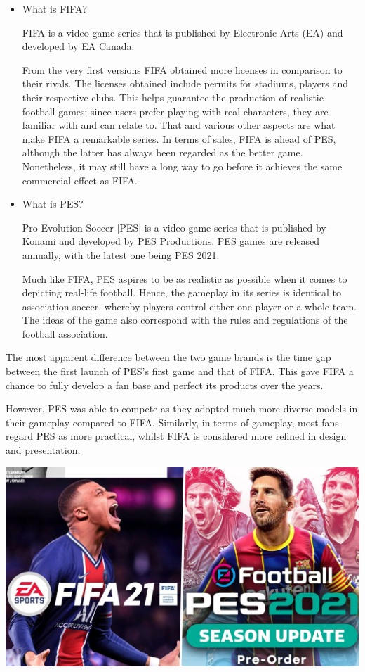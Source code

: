\documentclass[12pt,twoside,english,a4paper]{article}
\begin{document}
\begin{itemize}
\item What is FIFA?

FIFA is a video game series that is published by Electronic Arts (EA) and developed by EA Canada.

From the very first versions FIFA obtained more licenses in comparison to their rivals. The licenses obtained include permits for stadiums, players and their respective clubs. This helps guarantee the production of realistic football games; since users prefer playing with real characters, they are familiar with and can relate to. That and various other aspects are what make FIFA a remarkable series. In terms of sales, FIFA is ahead of PES, although the latter has always been regarded as the better game. Nonetheless, it may still have a long way to go before it achieves the same commercial effect as FIFA.

\item What is PES?

Pro Evolution Soccer [PES] is a video game series that is published by Konami and developed by PES Productions. PES games are released annually, with the latest one being PES 2021. 

Much like FIFA, PES aspires to be as realistic as possible when it comes to depicting real-life football. Hence, the gameplay in its series is identical to association soccer, whereby players control either one player or a whole team. The ideas of the game also correspond with the rules and regulations of the football association.
	
\end{itemize}

The most apparent difference between the two game brands is the time gap between the first launch of PES’s first game and that of FIFA. This gave FIFA a chance to fully develop a fan base and perfect its products over the years. 

However, PES was able to compete as they adopted much more diverse models in their gameplay compared to FIFA. Similarly, in terms of gameplay, most fans regard PES as more practical, whilst FIFA is considered more refined in design and presentation. 



\includegraphics[width=150mm,scale=1.5]{fifaandpes.jpeg} \label{fifaandpes}
\end{document}
